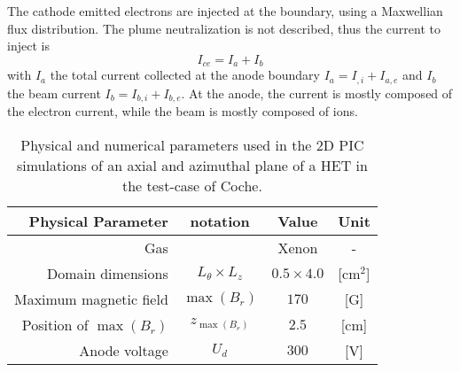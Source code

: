   The cathode emitted electrons are injected at the boundary, using a Maxwellian flux distribution.
  The plume neutralization is not described, thus the current to inject is
  \begin{equation} \label{eq-coche_Ice}
    I_{ce } = I_a + I_b
  \end{equation}
  with $I_a$ the total current collected at the anode boundary $I_a = I_{, i} + I_{a, e}$ and $I_b$ the beam current $I_{b} = I_{b, i} + I_{b, e}$. 
  At the anode, the current is mostly composed of the electron current, while the beam is mostly composed of ions.
  
  \begin{table}[htbp] %
       \centering
       \caption{\label{tab-parameters-coche} Physical and numerical parameters used in the \ac{2D} \ac{PIC} simulations of an axial and azimuthal \ztheta plane of a \ac{HET} in the test-case of Coche.}
       \begin{tabular}{@{}r c c c@{}} 
          \toprule
          {\bf Physical Parameter} & notation & Value & Unit \\
          \midrule
          Gas & & Xenon & - \\
          Domain dimensions & $L_{\theta} \times L_{z}$ & $0.5 \times 4.0$ & [cm$^2$] \\
          Maximum magnetic field & $\max(B_{r})$                    & $170$                 & [{G}] \\
          Position of  $\max(B_{r})$   & $z_{\max(B_{r})}$                    & $2.5$      & [cm] \\
          Anode voltage & $U_d$                    & $300$     & [V] \\


\end{tabular}
\end{table}
